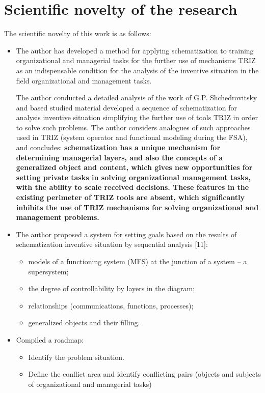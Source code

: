 \section{Scientific novelty of the research}
The scientific novelty of this work is as follows:
\begin{itemize}
\item The author has developed a method for applying schematization to
  training organizational and managerial tasks for the further use of
  mechanisms TRIZ as an indispensable condition for the analysis of the
  inventive situation in the field organizational and management tasks.

  The author conducted a detailed analysis of the work of G.P. Shchedrovitsky
  and based studied material developed a sequence of schematization for
  analysis inventive situation simplifying the further use of tools TRIZ in
  order to solve such problems. The author considers analogues of such
  approaches used in TRIZ (system operator and functional modeling during the
  FSA), and concludes: \textbf{schematization has a unique mechanism for
    determining managerial layers, and also the concepts of a generalized
    object and content, which gives new opportunities for setting private
    tasks in solving organizational management tasks, with the ability to
    scale received decisions. These features in the existing perimeter of TRIZ
    tools are absent, which significantly inhibits the use of TRIZ mechanisms
    for solving organizational and management problems.}
\item The author proposed a system for setting goals based on the results of schematization
inventive situation by sequential analysis [11]:
\begin{itemize}
\item models of a functioning system (MFS) at the junction of a system -- a
  supersystem;
\item the degree of controllability by layers in the diagram;
\item relationships (communications, functions, processes);
\item generalized objects and their filling.
\end{itemize}
\item Compiled a roadmap:
\begin{itemize}
\item Identify the problem situation.
\item Define the conflict area and identify conflicting pairs (objects and
  subjects of organizational and managerial tasks)

\end{itemize}
\end{itemize}
